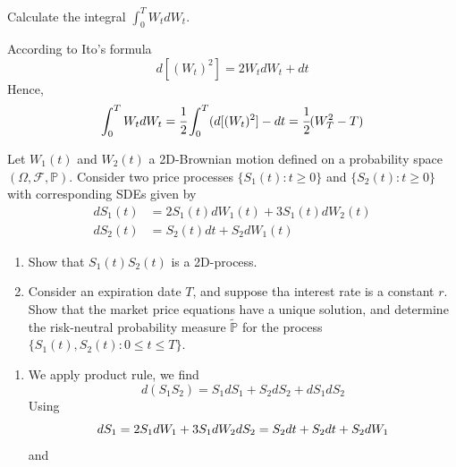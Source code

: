 \documentclass[12pt,a4paper]{exam}
\begin{document}
\begin{questions}

\question Calculate the integral $\int_0^T W_t dW_t$.
\begin{solution}
According to Ito's formula
\begin{equation*}
d[(W_t)^2] = 2W_t dW_t + dt
\end{equation*}
Hence,
\begin{equation*}
\int_0^T W_t dW_t = \cfrac{1}{2}\int_0^T(d[(W_t)^2] - dt = \cfrac{1}{2}(W^2_T - T)
\end{equation*}
\end{solution}



\question Let $W_1(t)$ and $W_2(t)$ a
 2D-Brownian motion defined on a probability space $(\Omega, \mathcal{F}, \mathbb{P})$. Consider two price processes $\{S_1(t):t\geq 0\}$ and $\{S_2(t):t\geq 0\}$ with corresponding SDEs given by
\begin{equation*}
\begin{aligned}
dS_1(t) &= 2S_1(t)dW_1(t) + 3S_1(t)dW_2(t)\\
dS_2(t) &= S_2(t)dt + S_2dW_1(t)
\end{aligned}
\end{equation*}
\begin{enumerate}[label=(\alph*),font=\itshape]
\item Show that $S_1(t)S_2(t)$ is a 2D-\ito process.
\item Consider an expiration date $T$, and suppose tha interest rate is a constant $r$. Show that the market price equations have a unique solution, and determine the risk-neutral probability measure $\tilde{\mathbb{P}}$ for the process $\{S_1(t),S_2(t):0\leq t\leq T\}$.
\end{enumerate}
\fillwithlines{3cm}
\begin{solution}
\begin{enumerate}[label=(\alph*),font=\itshape]
\item We apply \ito product rule, we find
\begin{equation*}
d(S_1S_2) = S_1dS_1+S_2dS_2+dS_1 dS_2
\end{equation*}
Using 
\begin{equation*}
dS_1 = 2S_1dW_1+3S_1dW_2 \\
dS_2 = S_2dt +S_2dt +S_2dW_1
\end{equation*}
and
\begin{equation*}

\end{equation*}
\end{enumerate}
\end{solution}
\end{questions}
\end{document}
